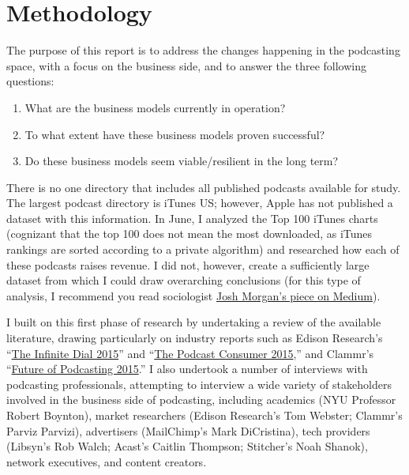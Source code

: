 \documentclass[notoc, symmetric, nobib, nols]{towcenter-guideto-book}
\begin{document}
\chapter{Methodology}

The purpose of this report is to address the changes happening in the podcasting space, with a focus on the business side, and to answer the three following questions: 

\begin{enumerate}
\item What are the business models currently in operation?
\item To what extent have these business models proven successful?
\item Do these business models seem viable/resilient in the long term? 
\end{enumerate}

There is no one directory that includes all published podcasts available for study. The largest podcast directory is iTunes US; however, Apple has not published a dataset with this information. In June, I analyzed the Top 100 iTunes charts (cognizant that the top 100 does not mean the most downloaded, as iTunes rankings are sorted according to a private algorithm) and researched how each of these podcasts raises revenue. I did not, however, create a sufficiently large dataset from which I could draw overarching conclusions (for this type of analysis, I recommend you read sociologist \href{https://medium.com/@slowerdawn/how-podcasts-have-changed-in-ten-years-by-the-numbers-720a6e984e4e}{Josh Morgan's piece on Medium}\autocite{morgan}).

I built on this first phase of research by undertaking a review of the available literature, drawing particularly on industry reports such as Edison Research's ``\href{http://www.edisonresearch.com/the-infinite-dial-2015/}{The Infinite Dial 2015}'' and ``\href{http://www.edisonresearch.com/the-podcast-consumer-2015/}{The Podcast Consumer 2015},'' and Clammr's ``\href{http://www.slideshare.net/clammrapp/20150617-future-of-podcasting-2015-clammr-v-f}{Future of Podcasting 2015}.'' I also undertook a number of interviews with podcasting professionals, attempting to interview a wide variety of stakeholders involved in the business side of podcasting, including academics (NYU Professor Robert Boynton), market researchers (Edison Research's Tom Webster; Clammr's Parviz Parvizi), advertisers (MailChimp's Mark DiCristina), tech providers (Libsyn's Rob Walch; Acast's Caitlin Thompson; Stitcher's Noah Shanok), network executives, and content creators. 
\end{document}
